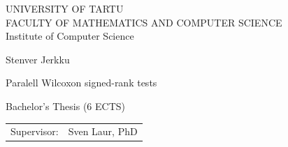 \documentclass[12pt]{article}
\begin{document}
\thispagestyle{empty}
\begin{center}

\large
UNIVERSITY OF TARTU\\[2mm]
\uppercase{Faculty of Mathematics and Computer Science}\\[2mm]
Institute of Computer Science\\

\vspace{25mm}

\Large Stenver Jerkku

\vspace{4mm}

\huge Paralell Wilcoxon signed-rank tests

\vspace{20mm}

\Large Bachelor's Thesis (6 ECTS)

\end{center}

\vspace{2mm}

\begin{flushright}
 {
 \setlength{\extrarowheight}{5pt}
 \begin{tabular}{r l}
  \sffamily Supervisor: & \sffamily Sven Laur, PhD
 \end{tabular}
 }
\end{flushright}

\vspace{10mm}

\vspace{2mm}



\vspace{2mm}


\vspace{8mm}
\end{document}
